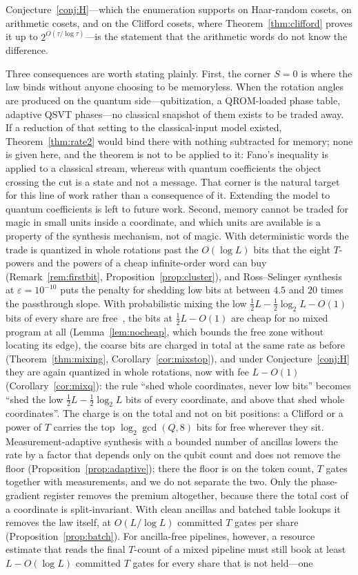 \documentclass[aps,prx,twocolumn,superscriptaddress,nofootinbib,longbibliography]{revtex4-2}
\theoremstyle{plain}
\theoremstyle{definition}
\theoremstyle{remark}
\begin{document}
Conjecture~\ref{conj:H}---which the enumeration supports on Haar-random cosets, on arithmetic cosets, and on the Clifford cosets, where Theorem~\ref{thm:clifford} proves it up to $2^{O(\tau/\log\tau)}$---is the statement that the arithmetic words do not know the difference.

Three consequences are worth stating plainly. First, the corner $S=0$ is where the law binds without anyone choosing to be memoryless. When the rotation angles are produced on the quantum side---qubitization, a QROM-loaded phase table, adaptive QSVT phases---no classical snapshot of them exists to be traded away. If a reduction of that setting to the classical-input model existed, Theorem~\ref{thm:rate2} would bind there with nothing subtracted for memory; none is given here, and the theorem is not to be applied to it: Fano's inequality is applied to a classical stream, whereas with quantum coefficients the object crossing the cut is a state and not a message. That corner is the natural target for this line of work rather than a consequence of it. Extending the model to quantum coefficients is left to future work. Second, memory cannot be traded for magic in small units inside a coordinate, and which units are available is a property of the synthesis mechanism, not of magic. With deterministic words the trade is quantized in whole rotations past the $O(\log L)$ bits that the eight $T$-powers and the powers of a cheap infinite-order word can buy (Remark~\ref{rem:firstbit}, Proposition~\ref{prop:cluster}), and Ross--Selinger synthesis at $\varepsilon=10^{-10}$ puts the penalty for shedding low bits at between $4.5$ and $20$ times the passthrough slope. With probabilistic mixing the low $\tfrac12L-\tfrac12\log_2L-O(1)$ bits of every share are free~\cite{Bothe}, the bits at $\tfrac12L-O(1)$ are cheap for no mixed program at all (Lemma~\ref{lem:nocheap}, which bounds the free zone without locating its edge), the coarse bits are charged in total at the same rate as before (Theorem~\ref{thm:mixing}, Corollary~\ref{cor:mixstop}), and under Conjecture~\ref{conj:H} they are again quantized in whole rotations, now with fee $L-O(1)$ (Corollary~\ref{cor:mixq}): the rule ``shed whole coordinates, never low bits'' becomes ``shed the low $\tfrac12L-\tfrac12\log_2L$ bits of every coordinate, and above that shed whole coordinates''. The charge is on the total and not on bit positions: a Clifford or a power of $T$ carries the top $\log_2\gcd(Q,8)$ bits for free wherever they sit. Measurement-adaptive synthesis with a bounded number of ancillas lowers the rate by a factor that depends only on the qubit count and does not remove the floor (Proposition~\ref{prop:adaptive}); there the floor is on the token count, $T$ gates together with measurements, and we do not separate the two. Only the phase-gradient register removes the premium altogether, because there the total cost of a coordinate is split-invariant. With clean ancillas and batched table lookups it removes the law itself, at $O(L/\log L)$ committed $T$ gates per share (Proposition~\ref{prop:batch}). For ancilla-free pipelines, however, a resource estimate that reads the final $T$-count of a mixed pipeline must still book at least $L-O(\log L)$ committed $T$ gates for every share that is not held---one 
\end{document}
